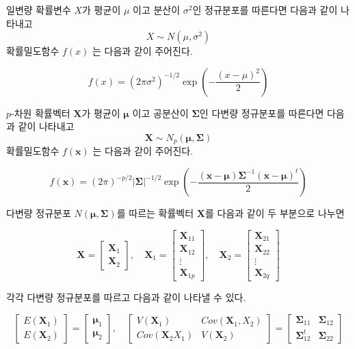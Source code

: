 \documentclass[
  11pt,
  a4paper,
  oneside]{scrbook}
\theoremstyle{definition}
\theoremstyle{plain}
\theoremstyle{definition}
\theoremstyle{definition}
\theoremstyle{remark}
\begin{document}
일변량 확률변수 \(X\)가 평균이 \(\mu\) 이고 분산이 \(\sigma^2\)인
정규분포를 따른다면 다음과 같이 나타내고 \[ X \sim N(\mu, \sigma^2 ) \]
확률밀도함수 \(f(x)\) 는 다음과 갇이 주어진다.

\[ f(x) = (2 \pi \sigma^2)^{-1/2} \exp \left ( - \frac{(x-\mu)^2}{2} \right ) \]

\(p\)-차원 확률벡터 \(\pmb X\)가 평균이 \(\pmb \mu\) 이고 공분산이
\(\pmb \Sigma\)인 다변량 정규분포를 따른다면 다음과 같이 나타내고
\[ \pmb X \sim N_p(\pmb \mu, \pmb \Sigma ) \] 확률밀도함수 \(f(\pmb x)\)
는 다음과 갇이 주어진다.

\[ f(\pmb x) = (2 \pi)^{-p/2} | \pmb \Sigma|^{-1/2} 
   \exp \left ( - \frac{(\pmb x-\pmb \mu) \pmb \Sigma^{-1}(\pmb x-\pmb \mu)^t}{2} \right ) \]

다변량 정규분포 \(N(\pmb \mu, \pmb \Sigma)\)를 따르는 확률벡터
\(\pmb X\)를 다음과 같이 두 부분으로 나누면

\[ 
  \pmb X = 
    \begin{bmatrix}
  \pmb X_1 \\
  \pmb X_2
  \end{bmatrix}, \quad
  \pmb X_1 = 
    \begin{bmatrix}
  \pmb X_{11} \\
  \pmb X_{12} \\
  \pmb \vdots \\
  \pmb X_{1p}
  \end{bmatrix}, \quad 
  \pmb X_2= 
    \begin{bmatrix}
  \pmb X_{21} \\
  \pmb X_{22} \\
  \pmb \vdots \\
  \pmb X_{2q}
  \end{bmatrix}
  \]

각각 다변량 정규분포를 따르고 다음과 같이 나타낼 수 있다.

\[ 
  \begin{bmatrix}
  E(\pmb X_1) \\
  E(\pmb X_2)
  \end{bmatrix}
  =
    \begin{bmatrix}
  \pmb \mu_1 \\
  \pmb \mu_2
  \end{bmatrix}
  , \quad 
  \begin{bmatrix}
  V(\pmb X_1) & Cov(\pmb X_1, X_2) \\
  Cov(\pmb X_2 X_1) & V(\pmb X_2)
  \end{bmatrix}
  =
    \begin{bmatrix}
  \pmb \Sigma_{11} & \pmb \Sigma_{12} \\
  \pmb \Sigma^t_{12} & \pmb \Sigma_{22}
  \end{bmatrix}
  \]
\end{document}
